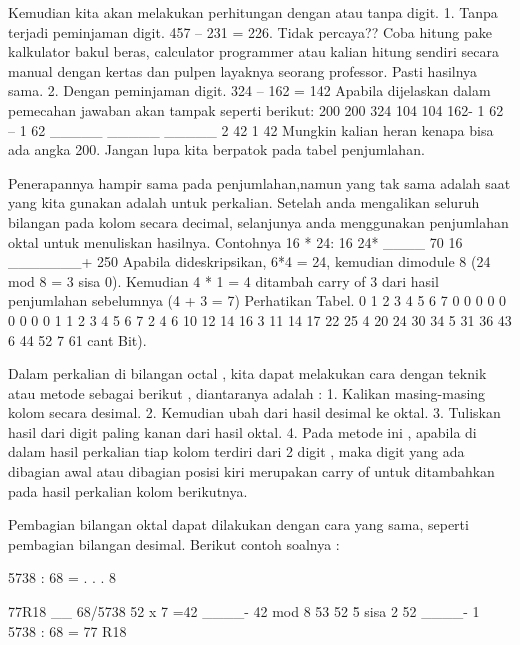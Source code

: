 Kemudian kita akan melakukan perhitungan dengan atau tanpa digit.  
1.	Tanpa terjadi peminjaman digit.
457 – 231 = 226. Tidak percaya?? Coba hitung pake kalkulator bakul beras, calculator programmer atau kalian hitung sendiri secara manual dengan kertas dan pulpen layaknya seorang professor. Pasti hasilnya sama.
2.	Dengan peminjaman digit.
324 – 162 = 142
Apabila dijelaskan dalam pemecahan jawaban akan tampak seperti berikut:
                                200                                         200
324                           104                                          104
162-                       1  62 –                                    1   62
_____                   _____                                   _____
    2                              42                                       1   42
Mungkin kalian heran kenapa bisa ada angka 200. Jangan lupa kita berpatok pada tabel penjumlahan.
	
Penerapannya hampir sama pada penjumlahan,namun yang tak sama adalah saat yang kita gunakan adalah untuk perkalian. Setelah anda mengalikan seluruh bilangan pada kolom secara decimal, selanjunya anda menggunakan penjumlahan oktal untuk menuliskan hasilnya.
Contohnya 16 * 24:
16
24*
____
                70
             16
            _______+
            250
Apabila dideskripsikan, 6*4 = 24, kemudian dimodule 8 (24 mod 8 = 3 sisa 0). Kemudian 4 * 1 = 4 ditambah carry of 3 dari hasil penjumlahan sebelumnya (4 + 3 = 7)
Perhatikan Tabel.
0	1	2	3	4	5	6	7
0	0	0	0	0	0	0	0	0
1	1	2	3	4	5	6	7
2	4	6	10	12	14	16
3	11	14	17	22	25
4	20	24	30	34
5	31	36	43
6	44	52
7	61
cant Bit).

Dalam perkalian di bilangan octal , kita dapat melakukan cara dengan teknik atau metode sebagai berikut , diantaranya adalah :
1.	Kalikan masing-masing kolom secara desimal.
2.	Kemudian ubah dari hasil desimal ke oktal.
3.	Tuliskan hasil dari digit paling kanan dari hasil oktal.
4.	Pada metode ini , apabila di dalam hasil perkalian tiap kolom terdiri dari 2 digit , maka digit yang ada dibagian awal atau dibagian posisi kiri merupakan carry of untuk ditambahkan pada hasil perkalian kolom berikutnya.


Pembagian bilangan oktal dapat dilakukan dengan cara yang sama, seperti pembagian bilangan desimal.
Berikut contoh soalnya :
	
5738 :  68 = . . . 8	
	 
	   77R18
	   __
	68/5738
	   52		\-\- x 7 =42
	   ____-	42 mod 8
	    53
	    52		\-\-\> \= 5 sisa 2 52
	   ____-
	   	 1
5738 : 68 = 77 R18

